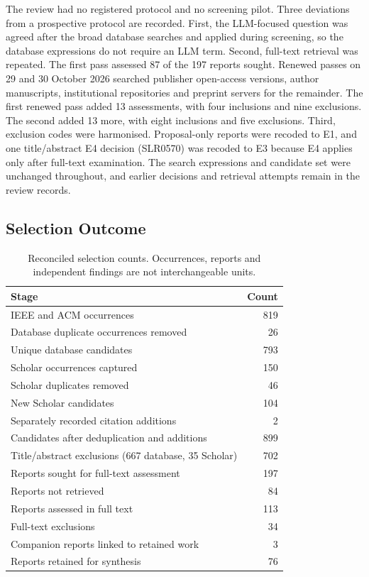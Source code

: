 The review had no registered protocol and no screening pilot. Three
deviations from a prospective protocol are recorded. First, the
LLM-focused question was agreed after the broad database searches and
applied during screening, so the database expressions do not require an
LLM term. Second, full-text retrieval was repeated. The first pass assessed
87 of the 197 reports sought. Renewed passes on 29 and 30 October 2026
searched publisher open-access versions, author manuscripts, institutional
repositories and preprint servers for the remainder. The first renewed pass
added 13 assessments, with four inclusions and nine exclusions. The second
added 13 more, with eight inclusions and five exclusions. Third, exclusion
codes were harmonised. Proposal-only reports were recoded to E1, and one
title/abstract E4 decision (SLR0570) was recoded to E3 because E4 applies
only after full-text examination. The search
expressions and candidate set were unchanged throughout, and earlier
decisions and retrieval attempts remain in the review records.

\subsection{Selection Outcome}

\begin{table}[htbp]
\centering\small
\caption{Reconciled selection counts. Occurrences, reports and independent
findings are not interchangeable units.}
\label{tab:slr:flow}
\begin{tabularx}{\textwidth}{@{}Xr@{}}
\toprule
Stage & Count \\
\midrule
IEEE and ACM occurrences & 819 \\
Database duplicate occurrences removed & 26 \\
Unique database candidates & 793 \\
Scholar occurrences captured & 150 \\
Scholar duplicates removed & 46 \\
New Scholar candidates & 104 \\
Separately recorded citation additions & 2 \\
Candidates after deduplication and additions & 899 \\
Title/abstract exclusions (667 database, 35 Scholar) & 702 \\
Reports sought for full-text assessment & 197 \\
Reports not retrieved & 84 \\
Reports assessed in full text & 113 \\
Full-text exclusions & 34 \\
Companion reports linked to retained work & 3 \\
Reports retained for synthesis & 76 \\
\bottomrule
\end{tabularx}
\end{table}

